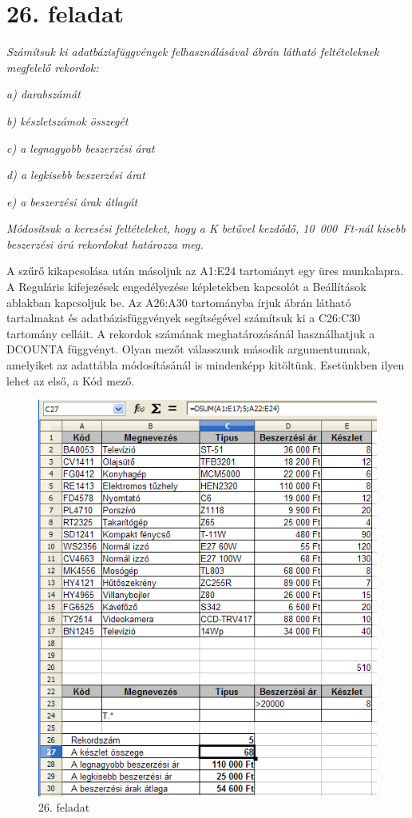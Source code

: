 \clearpage
\section{26. feladat}
{\itshape
Számítsuk ki adatbázisfüggvények felhasználásával  
ábrán látható feltételeknek megfelelő rekordok:}

{\itshape
a) darabszámát}

{\itshape
b) készletszámok összegét}

{\itshape
c) a legnagyobb beszerzési árat }

{\itshape
d) a legkisebb beszerzési árat}

{\itshape
e) a beszerzési árak átlagát}

{\itshape
Módosítsuk a keresési feltételeket, hogy a K betűvel
kezdődő, 10~000~Ft-nál kisebb beszerzési árú
 rekordokat határozza meg.}

A szűrő kikapcsolása után másoljuk az A1:E24 tartományt
egy üres munkalapra. A Reguláris kifejezések engedélyezése
képletekben kapcsolót a Beállítások ablakban kapcsoljuk be.
Az A26:A30 tartományba írjuk  ábrán látható
tartalmakat és adatbázisfüggvények segítségével
számítsuk ki a C26:C30 tartomány celláit. A rekordok
számának meghatározásánál használhatjuk a DCOUNTA
függvényt. Olyan mezőt válasszunk második argumentumnak,
amelyiket az adattábla módosításánál is mindenképp
kitöltünk. Esetünkben ilyen lehet az első, a Kód mező.

\begin{figure}[!h]
\begin{center}
\includegraphics[width=12.36cm]{oocalcv1-img120.png}
\caption{26. feladat}\label{26-feladat}
\end{center}
\end{figure}

